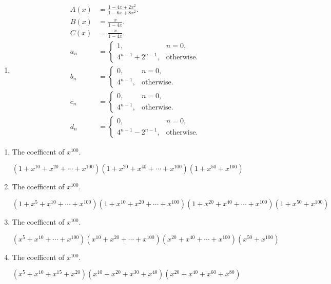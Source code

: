 \documentclass{../../cls/sig-alternate-05-2015}
\begin{document}
\begin{enumerate}
\begin{enumerate}
		\item \begin{align}
			A(x) & = \frac{1 - 4x + 2x^2}{1 - 6x + 8x^2}.\\
			B(x) & = \frac{x}{1 - 4x}.\\
			C(x) & = \frac{x}{1 - 4x}.\\
			a_n & = \begin{cases}
				1, & n = 0,\\
				4^{n-1} + 2^{n - 1}, & \text{otherwise}.
			\end{cases}\\
			b_n & = \begin{cases}
				0, & n = 0,\\
				4^{n - 1}, & \text{otherwise}.
			\end{cases}\\
			c_n & = \begin{cases}
				0, & n = 0,\\
				4^{n - 1}, & \text{otherwise}.
			\end{cases}\\
			d_n & = \begin{cases}
				0, & n = 0,\\
				4^{n - 1} - 2^{n - 1}, & \text{otherwise}.
			\end{cases}
		\end{align}
	\end{enumerate}
	\begin{enumerate}
		\item The coefficent of $x^{100}$.
		
		 $(1+x^{10}+x^{20}+\cdots+x^{100})(1+x^{20}+x^{40}+\cdots+x^{100})(1+x^{50}+x^{100})$
		 
		 \item The coefficent of $x^{100}$.
		 
		 $(1+x^{5}+x^{10}+\cdots+x^{100})(1+x^{10}+x^{20}+\cdots+x^{100})(1+x^{20}+x^{40}+\cdots+x^{100})(1+x^{50}+x^{100})$
		 
		 \item The coefficent of $x^{100}$.
		 
		 $(x^{5}+x^{10}+\cdots+x^{100})(x^{10}+x^{20}+\cdots+x^{100})(x^{20}+x^{40}+\cdots+x^{100})(x^{50}+x^{100})$
		 
		 \item The coefficent of $x^{100}$.
		 
		 $(x^{5}+x^{10}+ x^{15}+x^{20})(x^{10}+x^{20}+x^{30}+x^{40})(x^{20}+x^{40}+x^{60}+x^{80})$
	\end{enumerate}
\end{enumerate}
\end{document}
